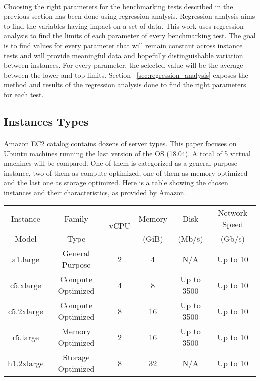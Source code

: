 \documentclass[11pt]{article}
\begin{document}
		\paragraph{} Choosing the right parameters for the benchmarking tests
		described in the previous section has been done using regression analysis.
		Regression analysis aims to find the variables having impact on a set of
		data. \cite{7} This work uses regression analysis to find the limits of each
		parameter of every benchmarking test. The goal is to find values for every
		parameter that will remain constant across instance tests and will provide
		meaningful data and hopefully distinguishable variation between instances. For
		every parameter, the selected value will be the average between the lower
		and top limits. Section ~\ref{sec:regression_analysis} exposes the method and results of the regression
		analysis done to find the right parameters for each test.
	\subsection{Instances Types}
		\paragraph{} Amazon EC2 catalog contains dozens of server types. This paper
		focuses on Ubuntu machines running the last version of the OS (18.04). A
		total of 5 virtual machines will be compared. One of them is categorized as
		a general purpose instance, two of them as compute optimized, one of them as memory
		optimized and the last one as storage optimized. Here is a table showing the
		chosen instances and their characteristics, as provided by Amazon.

		{\centering
			 \label{tab:instances_characteristics}
			\begin{tabular}{|c|c|c|c|c|c|}
				\hline
				Instance & Family & \multirow{2}{*}{vCPU} & Memory & Disk & Network Speed\\
				Model & Type & & (GiB) & (Mb/s) & (Gb/s)\\
				\hline
				a1.large & General Purpose & 2 & 4 & N/A & Up to 10 \\
				c5.xlarge & Compute Optimized & 4 & 8 & Up to 3500 & Up to 10 \\
				c5.2xlarge & Compute Optimized & 8 & 16 & Up to 3500 & Up to 10 \\
				r5.large & Memory Optimized & 2 & 16 & Up to 3500 & Up to 10 \\
				h1.2xlarge & Storage Optimized & 8 & 32 & N/A & Up to 10 \\
				\hline
			\end{tabular}
		\par }
		
\end{document}
